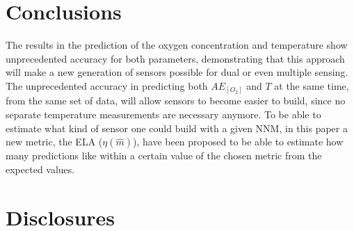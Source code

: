 \documentclass[9pt,twocolumn,twoside,pdftex]{optica}
\begin{document}
%
%
%


%
%
%
%




\section{Conclusions}

The results in the prediction of the oxygen concentration and temperature show unprecedented accuracy for both parameters, demonstrating that this approach will make a new generation of sensors possible for dual or even multiple sensing. The unprecedented accuracy in predicting both $AE_{[O_2]}$ and $T$ at the same time, from the same set of data, will allow sensors to become easier to build, since no separate temperature measurements are necessary anymore. To be able to estimate what kind of sensor one could build with a given NNM, in this paper a new metric, the ELA ($\eta(\hat m)$), have been proposed to be able to estimate how many predictions like within a certain value of the chosen metric from the expected values.





\section*{Disclosures}
\end{document}
